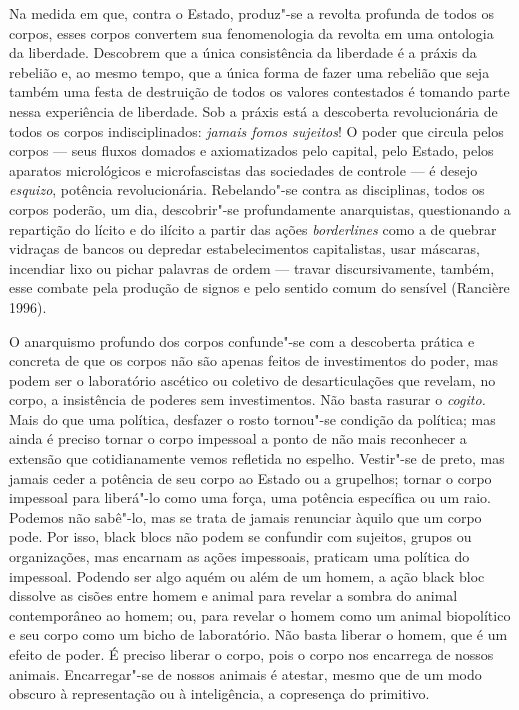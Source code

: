 Na medida em que, contra o Estado, produz"-se a revolta profunda de todos
os corpos, esses corpos convertem sua fenomenologia da revolta em uma
ontologia da liberdade. Descobrem que a única consistência da liberdade
é a práxis da rebelião e, ao mesmo tempo, que a única forma de fazer uma
rebelião que seja também uma festa de destruição de todos os valores
contestados é tomando parte nessa experiência de liberdade. Sob a práxis
está a descoberta revolucionária de todos os corpos indisciplinados:
\emph{jamais fomos sujeitos}! O poder que circula pelos corpos --- seus
fluxos domados e axiomatizados pelo capital, pelo Estado, pelos aparatos
micrológicos e microfascistas das sociedades de controle --- é desejo
\emph{esquizo}, potência revolucionária. Rebelando"-se contra as
disciplinas, todos os corpos poderão, um dia, descobrir"-se profundamente
anarquistas, questionando a repartição do lícito e do ilícito a partir
das ações \emph{borderlines }como a de quebrar vidraças de bancos ou
depredar estabelecimentos capitalistas, usar máscaras, incendiar lixo ou
pichar palavras de ordem --- travar discursivamente, também, esse combate
pela produção de signos e pelo sentido comum do sensível (Rancière
1996).

O anarquismo profundo dos corpos confunde"-se com a descoberta prática e
concreta de que os corpos não são apenas feitos de investimentos do
poder, mas podem ser o laboratório ascético ou coletivo de
desarticulações que revelam, no corpo, a insistência de poderes sem
investimentos. Não basta rasurar o \emph{cogito. }Mais do que uma
política, desfazer o rosto tornou"-se condição da política; mas ainda é
preciso tornar o corpo impessoal a ponto de não mais reconhecer a
extensão que cotidianamente vemos refletida no espelho. Vestir"-se de
preto, mas jamais ceder a potência de seu corpo ao Estado ou a
grupelhos; tornar o corpo impessoal para liberá"-lo como uma força, uma
potência específica ou um raio. Podemos não sabê"-lo, mas se trata de
jamais renunciar àquilo que um corpo pode. Por isso, black blocs não
podem se confundir com sujeitos, grupos ou organizações, mas encarnam as
ações impessoais, praticam uma política do impessoal. Podendo ser algo
aquém ou além de um homem, a ação black bloc dissolve as cisões entre
homem e animal para revelar a sombra do animal contemporâneo ao homem;
ou, para revelar o homem como um animal biopolítico e seu corpo como um
bicho de laboratório. Não basta liberar o homem, que é um efeito de
poder. É preciso liberar o corpo, pois o corpo nos encarrega de nossos
animais. Encarregar"-se de nossos animais é atestar, mesmo que de um modo
obscuro à representação ou à inteligência, a copresença do primitivo.

